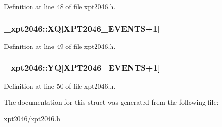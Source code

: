 Definition at line 48 of file xpt2046.\+h.

\subsubsection[{\texorpdfstring{XQ}{XQ}}]{ \+\_\+xpt2046\+::\+XQ\mbox{[}{\bf X\+P\+T2046\+\_\+\+E\+V\+E\+N\+TS}+1\mbox{]}}\hypertarget{struct__xpt2046_ac3f7953dda5a05a52276892bee461a29}{}\label{struct__xpt2046_ac3f7953dda5a05a52276892bee461a29}


Definition at line 49 of file xpt2046.\+h.

\subsubsection[{\texorpdfstring{YQ}{YQ}}]{ \+\_\+xpt2046\+::\+YQ\mbox{[}{\bf X\+P\+T2046\+\_\+\+E\+V\+E\+N\+TS}+1\mbox{]}}\hypertarget{struct__xpt2046_a0a1b0401066322d653135eb8db55d198}{}\label{struct__xpt2046_a0a1b0401066322d653135eb8db55d198}


Definition at line 50 of file xpt2046.\+h.



The documentation for this struct was generated from the following file\+:\begin{DoxyCompactItemize}
\item 
xpt2046/\hyperlink{xpt2046_8h}{xpt2046.\+h}\end{DoxyCompactItemize}
